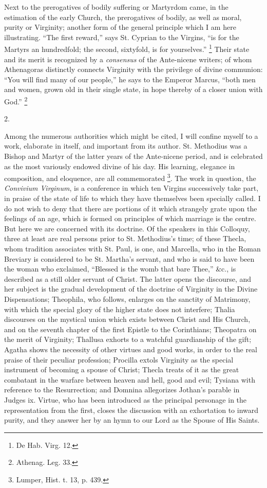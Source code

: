 Next to the prerogatives of bodily suffering or Martyrdom came, in
the estimation of the early Church, the prerogatives of bodily, as
well as moral, purity or Virginity; another form of the general
principle which I am here illustrating. ``The first reward,''
says St. Cyprian to the Virgins, ``is for the Martyrs an
hundredfold; the second, sixtyfold, is for yourselves.'' \footnote{De Hab. Virg. 12.} Their state and its merit is recognized by a \emph{ consensus} of the
Ante-nicene writers; of whom Athenagoras distinctly connects Virginity
with the privilege of divine communion: ``You will find many of
our people,'' he says to the Emperor Marcus, ``both men and
women, grown old in their single state, in hope thereby of a closer
union with God.'' \footnote{Athenag. Leg. 33.}

2.

Among the numerous authorities which might be cited, I will confine
myself to a work, elaborate in itself, and important from its author.
St. Methodius was a Bishop and Martyr of the latter years of the Ante-nicene
period, and is celebrated as the most variously endowed divine of his
day. His learning, elegance in composition, and eloquence, are all
commemorated \footnote{Lumper, Hist. t. 13, p. 439.}. The work
in question, the \emph{Convivium Virginum}, is a conference in which
ten Virgins successively take part, in praise of the state of life to
which they have themselves been specially called. I do not wish to
deny that there are portions of it which strangely grate upon the
feelings of an age, which is formed on principles of which marriage is
the centre. But here we are concerned with its doctrine. Of the
speakers in this Colloquy, three at least are real persons prior to
St. Methodius's time; of these Thecla, whom tradition associates with
St. Paul, is one, and Marcella, who in the Roman Breviary is
considered to be St. Martha's servant, and who is said to have been
the woman who exclaimed, ``Blessed is the womb that bare
Thee,'' \&c., is described as a still older servant of Christ.
The latter opens the discourse, and her subject is the gradual
development of the doctrine of Virginity in the Divine Dispensations;
Theophila, who follows, enlarges on the sanctity of Matrimony, with
which the special glory of the higher state does not interfere; Thalia
discourses on the mystical union which exists between Christ and His
Church, and on the seventh chapter of the first Epistle to the
Corinthians; Theopatra on the merit of Virginity; Thallusa exhorts to
a watchful guardianship of the gift; Agatha shows the necessity of
other virtues and good works, in order to the real praise of their
peculiar profession; Procilla extols Virginity as the special
instrument of becoming a spouse of Christ; Thecla treats of it as the
great combatant in the warfare between heaven and hell, good and evil;
Tysiana with reference to the Resurrection; and Domnina allegorizes
Jothan's parable in Judges ix. Virtue, who has been introduced as the
principal personage in the representation from the first, closes the
discussion with an exhortation to inward purity, and they answer her
by an hymn to our Lord as the Spouse of His Saints.

